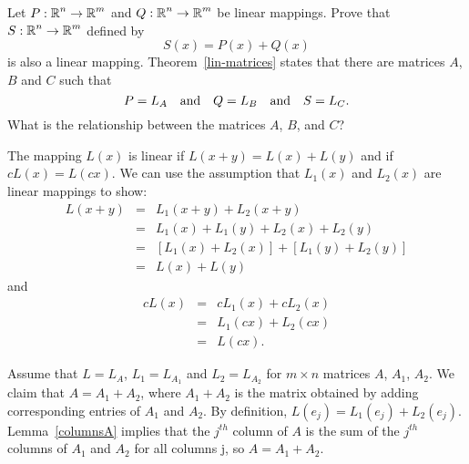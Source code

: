 \documentclass{ximera}
\begin{document}
\begin{exercise}  \label{c4.3.12}
Let $P:\mbox{$\Bbb{R}$}^n\to\mbox{$\Bbb{R}$}^m$ and $Q:\mbox{$\Bbb{R}$}^n\to\mbox{$\Bbb{R}$}^m$ be linear mappings. Prove
that $S:\mbox{$\Bbb{R}$}^n\to\mbox{$\Bbb{R}$}^m$ defined by
\[
S(x) = P(x) + Q(x)
\]
is also a linear mapping.  Theorem~\ref{lin-matrices} states that there
are matrices $A$, $B$ and $C$ such that
\[
P = L_A \quad\mbox{and}\quad Q = L_B \quad\mbox{and}\quad S = L_C .
\]
What is the relationship between the matrices $A$, $B$, and $C$?

\begin{solution}

The mapping $L(x)$ is linear if $L(x + y) = L(x) + L(y)$ and
if $cL(x) = L(cx)$.  We can use the assumption that $L_1(x)$
and $L_2(x)$ are linear mappings to show:
\[ \begin{array}{rcl}
L(x + y) & = & L_1(x + y) + L_2(x + y) \\
& = & L_1(x) + L_1(y) + L_2(x) + L_2(y) \\
& = & [L_1(x) + L_2(x)] + [L_1(y) + L_2(y)] \\
& = & L(x) + L(y) \end{array} \]
and
\[ \begin{array}{rcl}
cL(x) & = & cL_1(x) + cL_2(x) \\
& = & L_1(cx) + L_2(cx) \\
& = & L(cx). \end{array} \]

Assume that $L = L_A$, $L_1 = L_{A_1}$ and $L_2 = L_{A_2}$ for
$m \times n$ matrices $A$, $A_1$, $A_2$.  We claim that
$A = A_1 + A_2$, where $A_1 + A_2$ is the matrix obtained by
adding corresponding entries of $A_1$ and $A_2$.  By
definition, $L(e_j) = L_1(e_j) + L_2(e_j)$.  Lemma~\ref{columnsA}
implies that the $j^{th}$ column of $A$ is the sum of the
$j^{th}$ columns of $A_1$ and $A_2$ for all columns {j}, so
$A = A_1 + A_2$.

\end{solution}
\end{exercise}
\end{document}
